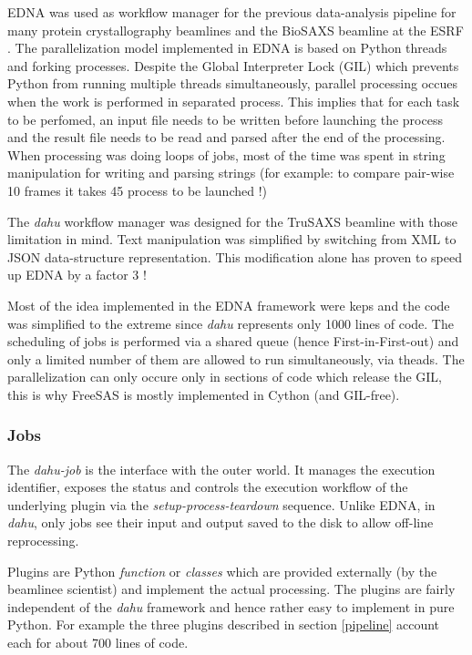 \documentclass[preprint]{iucr}              %
\begin{document}
EDNA\cite{EDNA} was used as workflow manager for the previous data-analysis pipeline for many protein crystallography beamlines and the BioSAXS beamline at the ESRF \cite{BM29ODA}.
The parallelization model implemented in EDNA is based on Python threads and forking processes. 
Despite the Global Interpreter Lock (GIL) which prevents Python from running multiple threads simultaneously, parallel processing occues when the work is performed
in separated process. 
This implies that for each task to be perfomed, an input file needs to be written before launching the process and the result file needs to be read and parsed after the end of the processing.
When processing was doing loops of jobs, most of the time was spent in string manipulation for writing and parsing strings (for example: to compare pair-wise 10 frames it takes 45 process to be launched !)
 
The \textit{dahu} workflow manager was designed for the TruSAXS beamline \cite{id02_2022} with those limitation in mind. 
Text manipulation was simplified by switching from XML to JSON data-structure representation. 
This modification alone has proven to speed up EDNA by a factor 3 !

Most of the idea implemented in the EDNA framework were keps and the code was simplified to the extreme since \textit{dahu} represents only 1000 lines of code. 
The scheduling of jobs is performed via a shared queue (hence First-in-First-out) and only a limited number of them are allowed to run simultaneously, via theads.
The parallelization can only occure only in sections of code which release the GIL, this is why FreeSAS is mostly implemented in Cython (and GIL-free).      

\subsubsection{Jobs}

The \textit{dahu-job} is the interface with the outer world. 
It manages the execution identifier, exposes the status and controls the execution workflow of the underlying plugin via the \textit{setup-process-teardown} sequence.
Unlike EDNA, in \textit{dahu}, only jobs see their input and output saved to the disk to allow off-line reprocessing.   

Plugins are Python \textit{function} or \textit{classes} which are provided externally (by the beamlinee scientist) and implement the actual processing.
The plugins are fairly independent of the \textit{dahu} framework and hence rather easy to implement in pure Python.
For example the three plugins described in section \ref{pipeline} account each for about 700 lines of code.  
\end{document}
